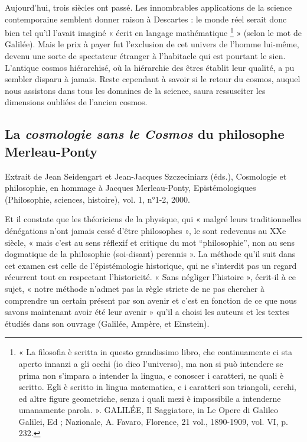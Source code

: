 \documentclass[a4paper,12pt]{article}
\begin{document}
Aujourd'hui, trois siècles ont passé. Les innombrables applications de la science contemporaine semblent donner raison à Descartes : le monde réel serait donc bien tel qu'il l'avait imaginé « écrit en langage mathématique \footnote{« La filosofia è scritta in questo grandissimo libro, che continuamente ci sta aperto innanzi a gli occhi (io dico l’universo), ma non si può intendere se prima non s’impara a intender la lingua, e conoscer i caratteri, ne quali è scritto. Egli è scritto in lingua matematica, e i caratteri son triangoli, cerchi, ed altre figure geometriche, senza i quali mezi è impossibile a intenderne umanamente parola. ». GALILÉE, Il Saggiatore, in Le Opere di Galileo Galilei, Ed ; Nazionale, A. Favaro, Florence, 21 vol., 1890-1909, vol. VI, p. 232.} » (selon le mot de Galilée). Mais le prix à payer fut l'exclusion de cet univers de l'homme lui-même, devenu une sorte de spectateur étranger à l'habitacle qui est pourtant le sien. L'antique cosmos hiérarchisé, où la hiérarchie des êtres établit leur qualité, a pu sembler disparu à jamais. Reste cependant à savoir si le retour du cosmos, auquel nous assistons dans tous les domaines de la science, saura ressusciter les dimensions oubliées de l'ancien cosmos.






\subsection {La \textit{cosmologie sans le Cosmos} du philosophe Merleau-Ponty}

Extrait de Jean Seidengart et Jean-Jacques Szczeciniarz (éds.), Cosmologie et philosophie, en hommage à
Jacques Merleau-Ponty, Epistémologiques (Philosophie, sciences, histoire), vol. 1, n°1-2, 2000.



Et il constate
que les théoriciens de la physique, qui « malgré leurs traditionnelles dénégations
n'ont jamais cessé d'être philosophes », le sont redevenus au XXe siècle, « mais
c'est au sens réflexif et critique du mot “philosophie”, non au sens dogmatique de
la philosophie (soi-disant) perennis ». La méthode qu'il suit dans cet examen est
celle de l'épistémologie historique, qui ne s'interdit pas un regard récurrent tout en
respectant l'historicité. « Sans négliger l'histoire », écrit-il à ce sujet, « notre
méthode n'admet pas la règle stricte de ne pas chercher à comprendre un certain
présent par son avenir et c'est en fonction de ce que nous savons maintenant avoir
été leur avenir » qu'il a choisi les auteurs et les textes étudiés dans son ouvrage
(Galilée, Ampère, et Einstein).
\end{document}
